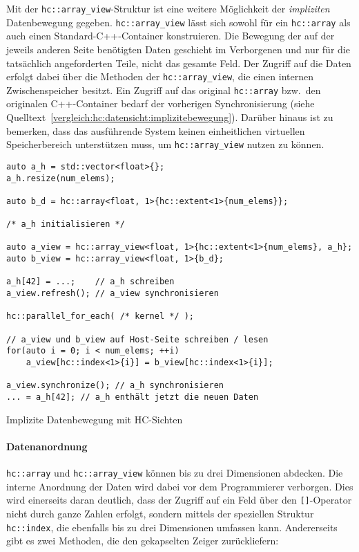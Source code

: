 Mit der \texttt{hc::array\_view}-Struktur ist eine weitere Möglichkeit der
\textit{impliziten} Datenbewegung gegeben. \texttt{hc::array\_view} lässt sich 
sowohl für ein \texttt{hc::array} als auch einen Standard-C++-Container
konstruieren. Die Bewegung der auf der jeweils anderen Seite benötigten Daten
geschieht im Verborgenen und nur für die tatsächlich angeforderten Teile, nicht
das gesamte Feld. Der Zugriff auf die Daten erfolgt dabei über die Methoden der
\texttt{hc::array\_view}, die einen internen Zwischenspeicher besitzt. Ein
Zugriff auf das original \texttt{hc::array} bzw.\ den originalen C++-Container
bedarf der vorherigen Synchronisierung (siehe
Quelltext~\ref{vergleich:hc:datensicht:implizitebewegung}). Darüber hinaus ist
zu bemerken, dass das ausführende System keinen einheitlichen virtuellen
Speicherbereich unterstützen muss, um \texttt{hc::array\_view} nutzen zu können.

\begin{code}
    \begin{verbatim}
auto a_h = std::vector<float>{};
a_h.resize(num_elems);

auto b_d = hc::array<float, 1>{hc::extent<1>{num_elems}};

/* a_h initialisieren */

auto a_view = hc::array_view<float, 1>{hc::extent<1>{num_elems}, a_h};
auto b_view = hc::array_view<float, 1>{b_d};

a_h[42] = ...;    // a_h schreiben
a_view.refresh(); // a_view synchronisieren

hc::parallel_for_each( /* kernel */ );

// a_view und b_view auf Host-Seite schreiben / lesen
for(auto i = 0; i < num_elems; ++i)
    a_view[hc::index<1>{i}] = b_view[hc::index<1>{i}];

a_view.synchronize(); // a_h synchronisieren
... = a_h[42]; // a_h enthält jetzt die neuen Daten
    \end{verbatim}
    \caption{Implizite Datenbewegung mit HC-Sichten}
    \label{vergleich:hc:datensicht:implizitebewegung}
\end{code}

\paragraph{Datenanordnung}

\texttt{hc::array} und \texttt{hc::array\_view} können bis zu drei Dimensionen
abdecken. Die interne Anordnung der Daten wird dabei vor dem Programmierer
verborgen. Dies wird einerseits daran deutlich, dass der Zugriff auf ein Feld
über den \texttt{[]}-Operator nicht durch ganze Zahlen erfolgt, sondern mittels
der speziellen Struktur \texttt{hc::index}, die ebenfalls bis zu drei
Dimensionen umfassen kann. Andererseits gibt es zwei Methoden, die den
gekapselten Zeiger zurückliefern:

